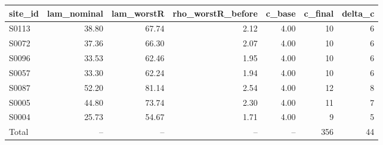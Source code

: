 \begin{tabular}{lrrrrrr}
\toprule
site\_id & lam\_nominal & lam\_worstR & rho\_worstR\_before & c\_base & c\_final & delta\_c \\
\midrule
S0113 & 38.80 & 67.74 & 2.12 & 4.00 & 10 & 6 \\
S0072 & 37.36 & 66.30 & 2.07 & 4.00 & 10 & 6 \\
S0096 & 33.53 & 62.46 & 1.95 & 4.00 & 10 & 6 \\
S0057 & 33.30 & 62.24 & 1.94 & 4.00 & 10 & 6 \\
S0087 & 52.20 & 81.14 & 2.54 & 4.00 & 12 & 8 \\
S0005 & 44.80 & 73.74 & 2.30 & 4.00 & 11 & 7 \\
S0004 & 25.73 & 54.67 & 1.71 & 4.00 & 9 & 5 \\
Total & -- & -- & -- & -- & 356 & 44 \\
\bottomrule
\end{tabular}
